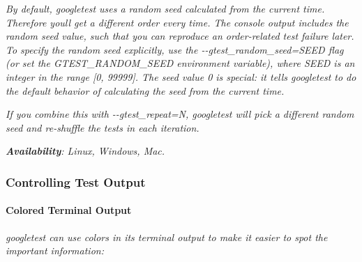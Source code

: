 {\itshape By default, googletest uses a random seed calculated from the current time. Therefore you\textquotesingle{}ll get a different order every time. The console output includes the random seed value, such that you can reproduce an order-\/related test failure later. To specify the random seed explicitly, use the {\ttfamily -\/-\/gtest\+\_\+random\+\_\+seed=S\+E\+ED} flag (or set the {\ttfamily G\+T\+E\+S\+T\+\_\+\+R\+A\+N\+D\+O\+M\+\_\+\+S\+E\+ED} environment variable), where {\ttfamily S\+E\+ED} is an integer in the range \mbox{[}0, 99999\mbox{]}. The seed value 0 is special\+: it tells googletest to do the default behavior of calculating the seed from the current time.}

{\itshape If you combine this with {\ttfamily -\/-\/gtest\+\_\+repeat=N}, googletest will pick a different random seed and re-\/shuffle the tests in each iteration.}

{\itshape {\bfseries{Availability}}\+: Linux, Windows, Mac.}

{\itshape \subsubsection*{Controlling Test Output}}

{\itshape }

{\itshape \paragraph*{Colored Terminal Output}}

{\itshape }

{\itshape googletest can use colors in its terminal output to make it easier to spot the important information\+:}

